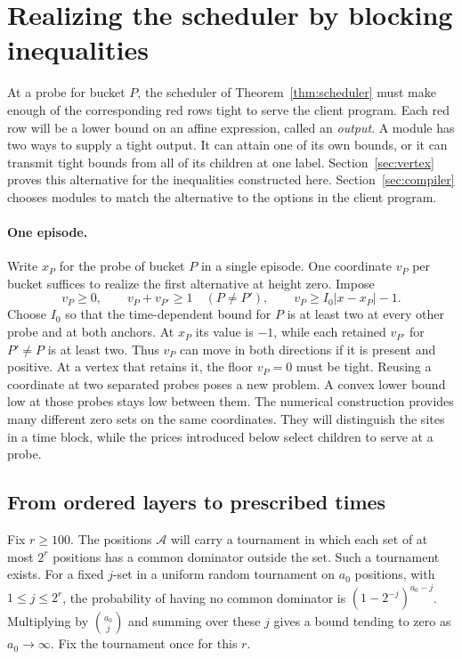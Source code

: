 \section{Realizing the scheduler by blocking inequalities}\label{sec:layers}

At a probe for bucket \(P\), the scheduler of
Theorem~\ref{thm:scheduler} must make enough of the corresponding red
rows tight to serve the client program. Each red row will be a lower
bound on an affine expression, called an \emph{output}. A module has two
ways to supply a tight output. It can attain one of its own bounds, or
it can transmit tight bounds from all of its children at one label.
Section~\ref{sec:vertex} proves this alternative for the inequalities
constructed here. Section~\ref{sec:compiler} chooses modules to match
the alternative to the options in the client program.

\paragraph{One episode.}
Write \(x_P\) for the probe of bucket \(P\) in a single episode.
One coordinate \(v_P\) per bucket suffices to realize the first alternative
at height zero. Impose
\begin{equation}\label{eq:base-module}
 v_P\ge0,\qquad v_P+v_{P'}\ge1\quad(P\ne P'),\qquad
 v_P\ge I_0|x-x_P|-1 .
\end{equation}
Choose \(I_0\) so that the time-dependent bound for \(P\) is at
least two at every other probe and at both anchors. At \(x_P\) its
value is \(-1\), while each retained \(v_{P'}\) for \(P'\ne P\) is at
least two. Thus \(v_P\) can move in both directions if it is present
and positive. At a vertex that retains it, the floor \(v_P=0\) must
be tight. Reusing a coordinate at two separated probes poses a new
problem. A convex lower bound low at those probes stays low between
them. The numerical construction provides many different zero sets
on the same coordinates. They will distinguish the sites in a time
block, while the prices introduced below select children to serve at
a probe.

\subsection{From ordered layers to prescribed times}

Fix \(r\ge100\). The positions \(\mathcal A\) will carry a tournament
in which each set of at most \(2^r\) positions has a common dominator
outside the set. Such a tournament exists. For a fixed \(j\)-set in
a uniform random tournament on \(a_0\) positions, with \(1\le j\le
2^r\), the probability of having no common dominator is
\((1-2^{-j})^{a_0-j}\). Multiplying by \(\binom{a_0}{j}\) and summing
over these \(j\) gives a bound tending to zero as \(a_0\to\infty\).
Fix the tournament once for this \(r\).


